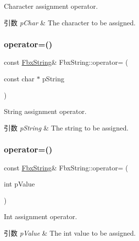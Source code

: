 Character assignment operator. 
\begin{DoxyParams}{引数}
{\em p\+Char} & The character to be assigned. \\
\hline
\end{DoxyParams}
\mbox{\label{class_fbx_string_ae7b0fb27fc17e865c14ff7cc2c9f1955}} 
\subsubsection{\texorpdfstring{operator=()}{operator=()}\hspace{0.1cm}{\footnotesize\ttfamily [3/6]}}
{\footnotesize\ttfamily const \hyperlink{class_fbx_string}{Fbx\+String}\& Fbx\+String\+::operator= (\begin{DoxyParamCaption}\item[{const char $\ast$}]{p\+String }\end{DoxyParamCaption})}

String assignment operator. 
\begin{DoxyParams}{引数}
{\em p\+String} & The string to be assigned. \\
\hline
\end{DoxyParams}
\mbox{\label{class_fbx_string_a6802ceb58edd86b235faeb52b8f06a04}} 
\subsubsection{\texorpdfstring{operator=()}{operator=()}\hspace{0.1cm}{\footnotesize\ttfamily [4/6]}}
{\footnotesize\ttfamily const \hyperlink{class_fbx_string}{Fbx\+String}\& Fbx\+String\+::operator= (\begin{DoxyParamCaption}\item[{int}]{p\+Value }\end{DoxyParamCaption})}

Int assignment operator. 
\begin{DoxyParams}{引数}
{\em p\+Value} & The int value to be assigned. \\
\hline
\end{DoxyParams}
\mbox{\label{class_fbx_string_ab1a856e62974efa0c55a056902bba66c}} 
